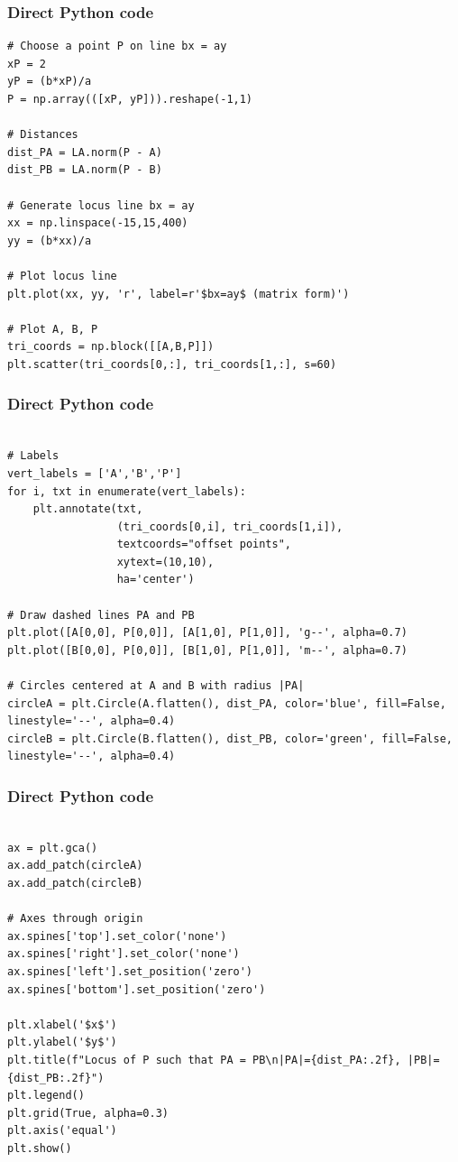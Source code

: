 \documentclass{beamer}
\begin{document}
\begin{frame}[fragile]\frametitle{Direct Python code}
\begin{lstlisting}
# Choose a point P on line bx = ay
xP = 2
yP = (b*xP)/a
P = np.array(([xP, yP])).reshape(-1,1)

# Distances
dist_PA = LA.norm(P - A)
dist_PB = LA.norm(P - B)

# Generate locus line bx = ay
xx = np.linspace(-15,15,400)
yy = (b*xx)/a

# Plot locus line
plt.plot(xx, yy, 'r', label=r'$bx=ay$ (matrix form)')

# Plot A, B, P
tri_coords = np.block([[A,B,P]])
plt.scatter(tri_coords[0,:], tri_coords[1,:], s=60)
\end{lstlisting}
\end{frame}
\begin{frame}[fragile]\frametitle{Direct Python code}
\begin{lstlisting}

# Labels
vert_labels = ['A','B','P']
for i, txt in enumerate(vert_labels):
    plt.annotate(txt,
                 (tri_coords[0,i], tri_coords[1,i]),
                 textcoords="offset points",
                 xytext=(10,10),
                 ha='center')

# Draw dashed lines PA and PB
plt.plot([A[0,0], P[0,0]], [A[1,0], P[1,0]], 'g--', alpha=0.7)
plt.plot([B[0,0], P[0,0]], [B[1,0], P[1,0]], 'm--', alpha=0.7)

# Circles centered at A and B with radius |PA|
circleA = plt.Circle(A.flatten(), dist_PA, color='blue', fill=False, linestyle='--', alpha=0.4)
circleB = plt.Circle(B.flatten(), dist_PB, color='green', fill=False, linestyle='--', alpha=0.4)
\end{lstlisting}
\end{frame}
\begin{frame}[fragile]\frametitle{Direct Python code}
\begin{lstlisting}

ax = plt.gca()
ax.add_patch(circleA)
ax.add_patch(circleB)

# Axes through origin
ax.spines['top'].set_color('none')
ax.spines['right'].set_color('none')
ax.spines['left'].set_position('zero')
ax.spines['bottom'].set_position('zero')

plt.xlabel('$x$')
plt.ylabel('$y$')
plt.title(f"Locus of P such that PA = PB\n|PA|={dist_PA:.2f}, |PB|={dist_PB:.2f}")
plt.legend()
plt.grid(True, alpha=0.3)
plt.axis('equal')
plt.show()

\end{lstlisting}
\end{frame}
\end{document}
